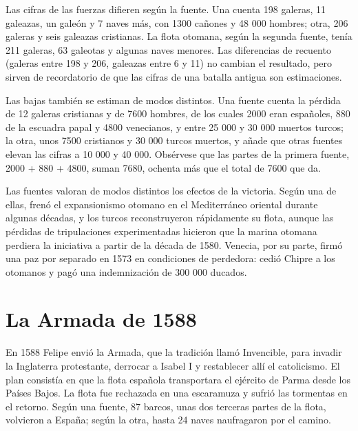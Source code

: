 \documentclass{book}
\begin{document}
Las cifras de las fuerzas difieren según la fuente. Una cuenta 198 galeras, 11 galeazas, un galeón y 7 naves más, con 1300 cañones y 48 000 hombres; otra, 206 galeras y seis galeazas cristianas. La flota otomana, según la segunda fuente, tenía 211 galeras, 63 galeotas y algunas naves menores. Las diferencias de recuento (galeras entre 198 y 206, galeazas entre 6 y 11) no cambian el resultado, pero sirven de recordatorio de que las cifras de una batalla antigua son estimaciones.


Las bajas también se estiman de modos distintos. Una fuente cuenta la pérdida de 12 galeras cristianas y de 7600 hombres, de los cuales 2000 eran españoles, 880 de la escuadra papal y 4800 venecianos, y entre 25 000 y 30 000 muertos turcos; la otra, unos 7500 cristianos y 30 000 turcos muertos, y añade que otras fuentes elevan las cifras a 10 000 y 40 000. Obsérvese que las partes de la primera fuente, 2000 + 880 + 4800, suman 7680, ochenta más que el total de 7600 que da.


Las fuentes valoran de modos distintos los efectos de la victoria. Según una de ellas, frenó el expansionismo otomano en el Mediterráneo oriental durante algunas décadas, y los turcos reconstruyeron rápidamente su flota, aunque las pérdidas de tripulaciones experimentadas hicieron que la marina otomana perdiera la iniciativa a partir de la década de 1580. Venecia, por su parte, firmó una paz por separado en 1573 en condiciones de perdedora: cedió Chipre a los otomanos y pagó una indemnización de 300 000 ducados.


\section{La Armada de 1588}

En 1588 Felipe envió la Armada, que la tradición llamó Invencible, para invadir la Inglaterra protestante, derrocar a Isabel I y restablecer allí el catolicismo. El plan consistía en que la flota española transportara el ejército de Parma desde los Países Bajos. La flota fue rechazada en una escaramuza y sufrió las tormentas en el retorno. Según una fuente, 87 barcos, unas dos terceras partes de la flota, volvieron a España; según la otra, hasta 24 naves naufragaron por el camino.
\end{document}
